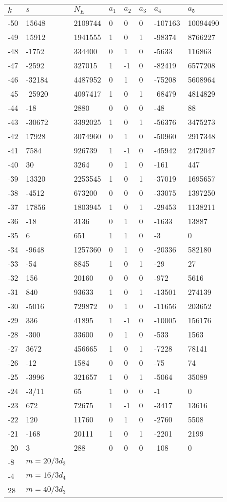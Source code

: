 \documentclass{amsart}
\begin{document}
\begin{longtable}{|l|l|l|lllll|}
\hline
$k$ & $s$ & $N_E$ & $a_1$ & $a_2$ & $a_3$ & $a_4$ & $a_5$\\
\hline
-50&15648&2109744&0&0&0&-107163&10094490\\
-49&15912&1941555&1&0&1&-98374&8766227\\
-48&-1752&334400&0&1&0&-5633&116863\\
-47&-2592&327015&1&-1&0&-82419&6577208\\
-46&-32184&4487952&0&1&0&-75208&5608964\\
-45&-25920&4097417&1&0&1&-68479&4814829\\
-44&-18&2880&0&0&0&-48&88\\
-43&-30672&3392025&1&0&1&-56376&3475273\\
-42&17928&3074960&0&1&0&-50960&2917348\\
-41&7584&926739&1&-1&0&-45942&2472047\\
-40&30&3264&0&1&0&-161&447\\
-39&13320&2253545&1&0&1&-37019&1695657\\
-38&-4512&673200&0&0&0&-33075&1397250\\
-37&17856&1803945&1&0&1&-29453&1138211\\
-36&-18&3136&0&1&0&-1633&13887\\
-35&6&651&1&1&0&-3&0\\
-34&-9648&1257360&0&1&0&-20336&582180\\
-33&-54&8845&1&0&1&-29&27\\
-32&156&20160&0&0&0&-972&5616\\
-31&840&93633&1&0&1&-13501&274139\\
-30&-5016&729872&0&1&0&-11656&203652\\
-29&336&41895&1&-1&0&-10005&156176\\
-28&-300&33600&0&1&0&-533&1563\\
-27&3672&456665&1&0&1&-7228&78141\\
-26&-12&1584&0&0&0&-75&74\\
-25&-3996&321657&1&0&1&-5064&35089\\
-24&-3/11&65&1&0&0&-1&0\\
-23&672&72675&1&-1&0&-3417&13616\\
-22&120&11760&0&1&0&-2760&5508\\
-21&-168&20111&1&0&1&-2201&2199\\
-20&3&288&0&0&0&-108&0\\
-8&$m=20/3d_{3}$&&\multicolumn{5}{c|}{}\\
-4&$m=16/3d_{4}$&&\multicolumn{5}{c|}{}\\
28&$m=40/3d_{3}$&&\multicolumn{5}{c|}{}\\
\hline
\end{longtable}
\end{document}
